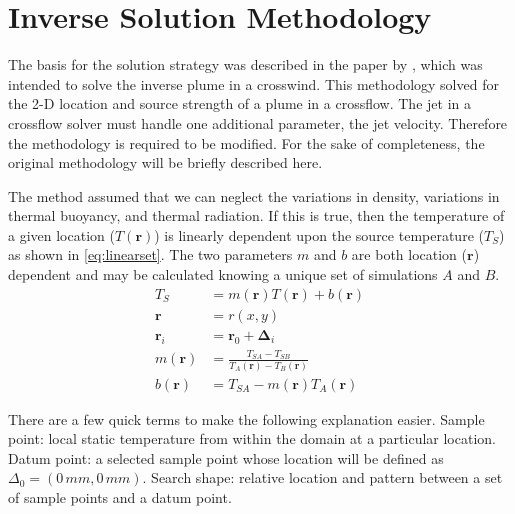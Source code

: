 \documentclass[preprint,12pt]{elsarticle}
\newcommand{\bv}[1]{\boldsymbol #1}  %
\begin{document}
\section{Inverse Solution Methodology}
The basis for the solution strategy was described in the paper by \citet{ijhmt1}, which was intended to solve the inverse plume in a crosswind.  This methodology solved for the 2-D location and source strength of a plume in a crossflow.  The jet in a crossflow solver must handle one additional parameter, the jet velocity.  Therefore the methodology is required to be modified.  For the sake of completeness, the original methodology will be briefly described here.

The method assumed that we can neglect the variations in density, variations in thermal buoyancy, and thermal radiation.  If this is true, then the temperature of a given location ($T\left( \bv r \right)$) is linearly dependent upon the source temperature ($T_S$) as shown in \cref{eq:linearset}.  The two parameters $m$ and $b$ are both location ($\bv{r}$) dependent and may be calculated knowing a unique set of simulations $A$ and $B$.
\begin{subequations}
\label{eq:linearset}
\begin{align}
T_S &= m\left(  \bv r  \right) T\left( \bv r \right) + b\left( \bv r \right) \label{eq:linear} \\
\bv r &= r\left( x, y\right) \label{eq:vector}\\
\bv{r_i} & = \bv{r_0} + \bv{\Delta_i} \label{eq:delta}\\
m\left( \bv r \right) &= \frac{T_{SA} - T_{SB}}{T_A\left( \bv r \right) - T_B\left( \bv r \right)} \label{eq:m} \\
b\left( \bv r \right) &= T_{SA} - m\left( \bv r \right) T_A \left( \bv r \right) \label{eq:b}
\end{align}
\end{subequations}

There are a few quick terms to make the following explanation easier.  Sample point: local static temperature from within the domain at a particular location.  Datum point: a selected sample point whose location will be defined as $\Delta_{0} = (0\,mm,0\,mm)$.  Search shape: relative location and pattern between a set of sample points and a datum point.
\end{document}

